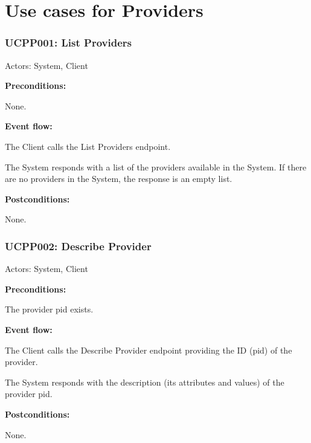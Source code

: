 \section{Use cases for Providers}

\begin{ucbox}{\subsubsection{UCPP001: List Providers}}
\label{UCPP001}

Actors: System, Client

\textbf{Preconditions:}

\ucitem None.

\textbf{Event flow:}

\ucitem The Client calls the List Providers endpoint.

\ucitem The System responds with a list of the providers available in the System. If there are no providers in the System, the response is an empty list.

\textbf{Postconditions:}

\ucitem None.

\end{ucbox}

\begin{ucbox}{\subsubsection{UCPP002: Describe Provider}}
\label{UCPP002}

Actors: System, Client

\textbf{Preconditions:}

\ucitem The provider pid exists.

\textbf{Event flow:}

\ucitem The Client calls the Describe Provider endpoint providing the ID (pid) of the provider.

\ucitem The System responds with the description (its attributes and values) of the provider pid.

\textbf{Postconditions:}

\ucitem None.

\end{ucbox}

